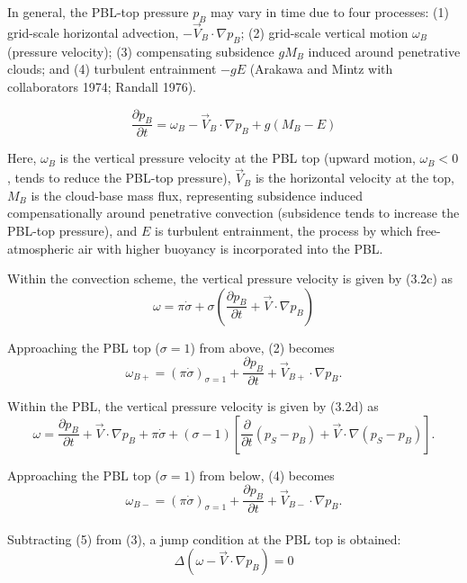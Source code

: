 \documentclass[12pt,openany]{book}
\begin{document}
In general, the PBL-top pressure $p_B$ may vary in time due to four processes:
(1) grid-scale horizontal advection, $-\vec{V}_B \cdot \nabla p_B$;
(2) grid-scale vertical motion $\omega_B$ (pressure velocity);
(3) compensating subsidence $g M_B$ induced around penetrative clouds; and
(4) turbulent entrainment $-g E$
(Arakawa and Mintz with collaborators 1974; Randall 1976).

\begin{equation}
\frac{\partial p_B}{\partial t}
=
\omega_B
-
\vec{V}_B \cdot \nabla p_B
+
g (M_B - E)
\tag{4.1}\label{eq:4.1}
\end{equation}

Here, $\omega_B$ is the vertical pressure velocity at the PBL top
(upward motion, $\omega_B < 0$, tends to reduce the PBL-top pressure),
$\vec{V}_B$ is the horizontal velocity at the top,
$M_B$ is the cloud-base mass flux, representing subsidence induced compensationally around penetrative convection (subsidence tends to increase the PBL-top pressure),
and $E$ is turbulent entrainment, the process by which free-atmospheric air with higher buoyancy is incorporated into the PBL.

Within the convection scheme, the vertical pressure velocity is given by (3.2c) as
\begin{equation}
\omega
=
\pi \dot{\sigma}
+
\sigma
\left(
\frac{\partial p_B}{\partial t}
+
\vec{V} \cdot \nabla p_B
\right)
\tag{4.2}\label{eq:4.2}
\end{equation}

Approaching the PBL top ($\sigma = 1$) from above, (2) becomes
\begin{equation}
\omega_{B+}
=
(\pi \dot{\sigma})_{\sigma=1}
+
\frac{\partial p_B}{\partial t}
+
\vec{V}_{B+} \cdot \nabla p_B .
\tag{4.3}\label{eq:4.3}
\end{equation}

Within the PBL, the vertical pressure velocity is given by (3.2d) as
\begin{equation}
\omega
=
\frac{\partial p_B}{\partial t}
+
\vec{V} \cdot \nabla p_B
+
\pi \dot{\sigma}
+
(\sigma - 1)
\left[
\frac{\partial}{\partial t}(p_S - p_B)
+
\vec{V} \cdot \nabla (p_S - p_B)
\right] .
\tag{4.4}\label{eq:4.4}
\end{equation}

Approaching the PBL top ($\sigma = 1$) from below, (4) becomes
\begin{equation}
\omega_{B-}
=
(\pi \dot{\sigma})_{\sigma=1}
+
\frac{\partial p_B}{\partial t}
+
\vec{V}_{B-} \cdot \nabla p_B .
\tag{4.5}\label{eq:4.5}
\end{equation}
\\
Subtracting (5) from (3), a jump condition at the PBL top is obtained:
\begin{equation}
\Delta\left(\omega - \vec{V} \cdot \nabla p_B \right)
=
0
\tag{4.6}\label{eq:4.6}
\end{equation}
\end{document}
